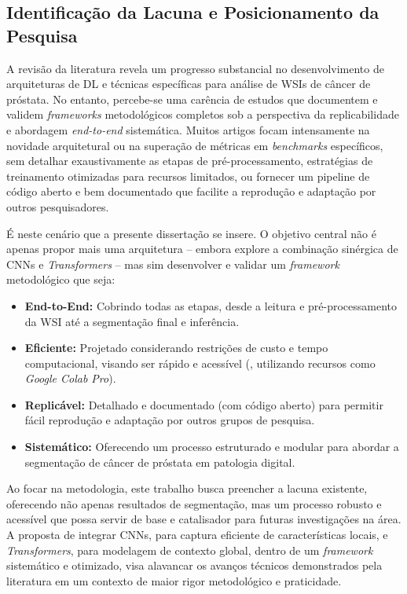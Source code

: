 \subsection{Identificação da Lacuna e Posicionamento da Pesquisa}\label{subsec:lacuna_posicionamento}

A revisão da literatura revela um progresso substancial no desenvolvimento de arquiteturas de DL e técnicas específicas para análise de WSIs de câncer de próstata. No entanto, percebe-se uma carência de estudos que documentem e validem \textit{frameworks} metodológicos completos sob a perspectiva da replicabilidade e abordagem \textit{end-to-end} sistemática. Muitos artigos focam intensamente na novidade arquitetural ou na superação de métricas em \textit{benchmarks} específicos, sem detalhar exaustivamente as etapas de pré-processamento, estratégias de treinamento otimizadas para recursos limitados, ou fornecer um pipeline de código aberto e bem documentado que facilite a reprodução e adaptação por outros pesquisadores.

É neste cenário que a presente dissertação se insere. O objetivo central não é apenas propor mais uma arquitetura – embora explore a combinação sinérgica de CNNs e \textit{Transformers} – mas sim desenvolver e validar um \textit{framework} metodológico que seja:
\begin{itemize}
    \item \textbf{End-to-End:} Cobrindo todas as etapas, desde a leitura e pré-processamento da WSI até a segmentação final e inferência.
    \item \textbf{Eficiente:} Projetado considerando restrições de custo e tempo computacional, visando ser rápido e acessível (\eg, utilizando recursos como \textit{Google Colab Pro}).
    \item \textbf{Replicável:} Detalhado e documentado (com código aberto) para permitir fácil reprodução e adaptação por outros grupos de pesquisa.
    \item \textbf{Sistemático:} Oferecendo um processo estruturado e modular para abordar a segmentação de câncer de próstata em patologia digital.
\end{itemize}

Ao focar na metodologia, este trabalho busca preencher a lacuna existente, oferecendo não apenas resultados de segmentação, mas um processo robusto e acessível que possa servir de base e catalisador para futuras investigações na área. A proposta de integrar CNNs, para captura eficiente de características locais, e \textit{Transformers}, para modelagem de contexto global, dentro de um \textit{framework} sistemático e otimizado, visa alavancar os avanços técnicos demonstrados pela literatura em um contexto de maior rigor metodológico e praticidade.
